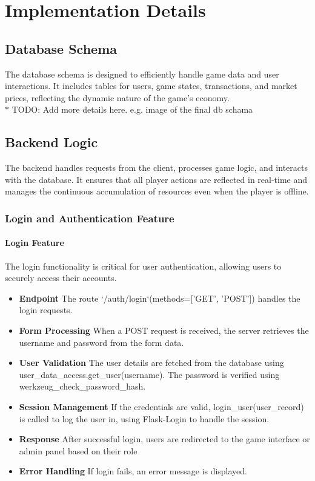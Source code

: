 \documentclass[12pt]{article}
\begin{document}
\section{Implementation Details}
\subsection{Database Schema}
The database schema is designed to efficiently handle game data and user interactions. It includes tables for users, game states, transactions, and market prices, reflecting the dynamic nature of the game's economy.
\\ $\ast$ TODO: Add more details here. e.g. image of the final db schama

\subsection{Backend Logic}
The backend handles requests from the client, processes game logic, and interacts with the database. It ensures that all player actions are reflected in real-time and manages the continuous accumulation of resources even when the player is offline.
\subsubsection{Login and Authentication Feature}
\paragraph{Login Feature}
The login functionality is critical for user authentication, allowing users to securely access their accounts.
\begin{itemize}
    \item \textbf{Endpoint} The route `/auth/login`(methods=['GET', 'POST']) handles the login requests.
    \item \textbf{Form Processing} When a POST request is received, the server retrieves the username and password from the form data.
    \item \textbf{User Validation} The user details are fetched from the database using user\_data\_access.get\_user(username). The password is verified using werkzeug\_check\_password\_hash.
    \item \textbf{Session Management}  If the credentials are valid, login\_user(user\_record) is called to log the user in, using Flask-Login to handle the session.
    \item \textbf{Response} After successful login, users are redirected to the game interface or admin panel based on their role
    \item \textbf{Error Handling} If login fails, an error message is displayed.
\end{itemize}
\end{document}
